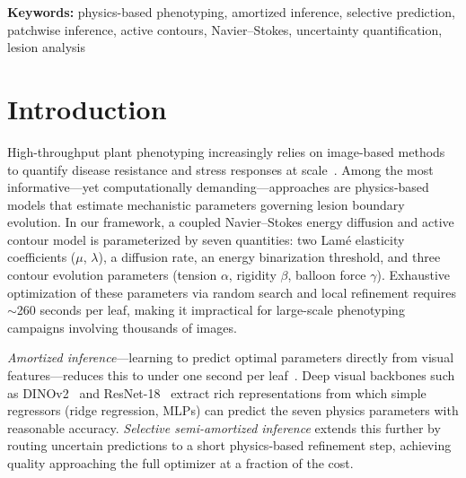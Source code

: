 \documentclass[11pt,a4paper]{article}
\begin{document}
\vspace{1em}
\noindent\textbf{Keywords:} physics-based phenotyping, amortized inference, selective prediction, patchwise inference, active contours, Navier--Stokes, uncertainty quantification, lesion analysis

\section{Introduction}
\label{sec:intro}

High-throughput plant phenotyping increasingly relies on image-based methods to quantify disease resistance and stress responses at scale~\citep{singh2018plantdisease, ghosal2018explainable}.
Among the most informative---yet computationally demanding---approaches are physics-based models that estimate mechanistic parameters governing lesion boundary evolution.
In our framework, a coupled Navier--Stokes energy diffusion and active contour model is parameterized by seven quantities: two Lam\'{e} elasticity coefficients ($\mu$, $\lambda$), a diffusion rate, an energy binarization threshold, and three contour evolution parameters (tension $\alpha$, rigidity $\beta$, balloon force $\gamma$).
Exhaustive optimization of these parameters via random search and local refinement requires $\sim$260 seconds per leaf, making it impractical for large-scale phenotyping campaigns involving thousands of images.

\emph{Amortized inference}---learning to predict optimal parameters directly from visual features---reduces this to under one second per leaf~\citep{cranmer2020amortized, radev2020bayesflow}.
Deep visual backbones such as DINOv2~\citep{oquab2024dinov2} and ResNet-18~\citep{he2016resnet} extract rich representations from which simple regressors (ridge regression, MLPs) can predict the seven physics parameters with reasonable accuracy.
\emph{Selective semi-amortized inference} extends this further by routing uncertain predictions to a short physics-based refinement step, achieving quality approaching the full optimizer at a fraction of the cost.
\end{document}
